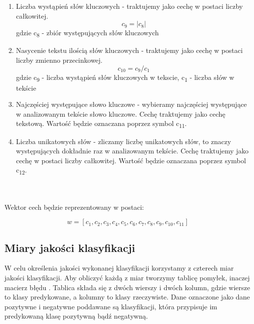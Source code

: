 \documentclass{classrep}
\begin{document}
\begin{enumerate}
  \item Liczba wystąpień słów kluczowych - traktujemy jako cechę w postaci liczby całkowitej.\begin{equation}  c_9 = | c_8 | \end{equation} gdzie c\textsubscript{8} - zbiór występujących słów kluczowych\\
  \item Nasycenie tekstu ilością słów kluczowych - traktujemy jako cechę w postaci liczby zmienno przecinkowej.  \begin{equation} c_{10} = c_9 / c_1 \end{equation}  gdzie c\textsubscript{9} - liczba wystąpień słów kluczowych w tekscie, c\textsubscript{1} - liczba słów w tekście\\
  \item Najczęściej występujące słowo kluczowe - wybieramy najczęściej występujące w analizowanym tekście słowo kluczowe. Cechę traktujemy jako cechę tekstową. Wartość będzie oznaczana poprzez symbol  c\textsubscript{11}.\\
  \item Liczba unikatowych słów - zliczamy liczbę unikatowych słów, to znaczy występujących dokładnie raz w analizowanym tekście. Cechę traktujemy jako cechę w postaci liczby całkowitej. Wartość będzie oznaczana poprzez symbol  c\textsubscript{12}.\\
\end{enumerate}

\ \\ \\
Wektor cech będzie reprezentowany w postaci: 

\begin{equation} w = [c_1, c_2, c_3, c_4, c_5, c_6, c_7, c_8, c_9, c_{10}, c_{11}] \end{equation}


\subsection{Miary jakości klasyfikacji} 

W celu określenia jakości wykonanej klasyfikacji korzystamy z czterech miar jakości klasyfikacji. Aby obliczyć każdą z miar tworzymy tablicę pomyłek, inaczej macierz błędu \cite{tablica}. Tablica składa się z dwóch wierszy i dwóch kolumn, gdzie wiersze to klasy predykowane, a kolumny to klasy rzeczywiste. Dane oznaczone jako dane pozytywne i negatywne poddawane są klasyfikacji, która przypisuje im predykowaną klasę pozytywną bądź negatywną.\\
\end{document}
